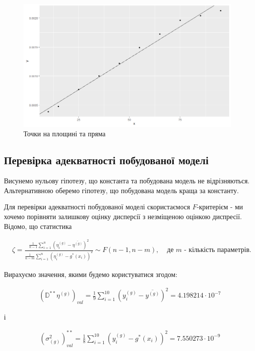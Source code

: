 \documentclass[14pt,a4paper]{scrartcl}
\theoremstyle{definition}
\theoremstyle{remark}
\theoremstyle{definition}
\theoremstyle{definition}
\begin{document}
\begin{figure}[H]
  \includegraphics[width=\linewidth]{Plot_Line.png}
  \caption{Точки на площині та пряма}
  \label{fig:image3}
\end{figure}

\subsection{Перевірка адекватності побудованої моделі}

Висунемо нульову гіпотезу, що константа та побудована модель не відрізняються. Альтернативною оберемо гіпотезу, що побудована модель краща за константу.

Для перевірки адекватності побудованої моделі скористаємося $F$-критерієм - ми хочемо порівняти залишкову оцінку дисперсії з незміщеною оцінкою диспресії. Відомо, що статистика

\begin{align*}
  & \zeta = \frac{\frac{1}{n - 1} \sum_{i = 1}^{n} (\eta_{i}^{(g)} - \overline{\eta^{(g)}})^2}{\frac{1}{n - m} \sum_{i = 1}^{n} (\eta_{i}^{(g)} - g^{*}(x_{i}))^2} \sim F(n - 1, n - m),  & \text{  де  } m \text{ - кількість параметрів.}
\end{align*}

Вирахуємо значення, якими будемо користуватися згодом:

\begin{align*}
   & (\mathbb{D}^{**}\eta^{(g)})_{val} = \frac{1}{9} \sum_{i = 1}^{10} (y_{i}^{(g)} - \overline{y^{(g)}})^2 = 4.198214 \cdot 10^{-7}
\end{align*}

і

\begin{align*}
   & (\sigma_{(g)}^2)^{**}_{val} = \frac{1}{8} \sum_{i = 1}^{10} (y_{i}^{(g)} - g^{*}(x_{i}))^2 = 7.550273 \cdot 10^{-9}
\end{align*}
\end{document}
